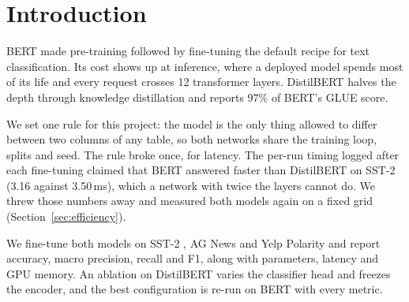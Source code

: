 \section{Introduction}

BERT \citep{devlin2019bert} made pre-training followed by fine-tuning the
default recipe for text classification. Its cost shows up at inference, where
a deployed model spends most of its life and every request crosses 12
transformer layers. DistilBERT \citep{sanh2019distilbert} halves the depth
through knowledge distillation and reports 97\% of BERT's GLUE score.

We set one rule for this project: the model is the only thing allowed to
differ between two columns of any table, so both networks share the training
loop, splits and seed. The rule broke once, for latency. The per-run timing logged after each
fine-tuning claimed that BERT answered faster than DistilBERT on SST-2
(3.16 against 3.50\,ms), which a network with twice the layers cannot do. We
threw those numbers away and measured both models again on a fixed grid
(Section~\ref{sec:efficiency}).

We fine-tune both models on SST-2 \citep{socher2013sst,wang2019glue},
AG News and Yelp Polarity \citep{zhang2015character} and report accuracy,
macro precision, recall and F1, along with parameters, latency and GPU
memory. An ablation on DistilBERT varies the classifier head and freezes the
encoder, and the best configuration is re-run on BERT with every metric.
